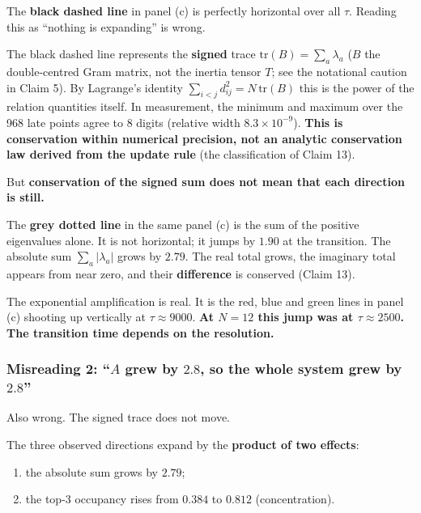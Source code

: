 \documentclass[
  10pt,
]{article}
\providecommand{\tightlist}{%
  \setlength{\itemsep}{0pt}\setlength{\parskip}{0pt}}
\begin{document}
The \textbf{black dashed line} in panel (c) is perfectly horizontal over
all \(\tau\). Reading this as ``nothing is expanding'' is wrong.

The black dashed line represents the \textbf{signed} trace
\(\mathrm{tr}(B) = \sum_a\lambda_a\) (\(B\) the double-centred Gram
matrix, not the inertia tensor \(T\); see the notational caution in
Claim 5). By Lagrange's identity
\(\sum_{i<j}d_{ij}^2 = N\,\mathrm{tr}(B)\) this is the power of the
relation quantities itself. In measurement, the minimum and maximum over
the 968 late points agree to 8 digits (relative width
\(8.3\times10^{-9}\)). \textbf{This is conservation within numerical
precision, not an analytic conservation law derived from the update
rule} (the classification of Claim 13).

But \textbf{conservation of the signed sum does not mean that each
direction is still.}

The \textbf{grey dotted line} in the same panel (c) is the sum of the
positive eigenvalues alone. It is not horizontal; it jumps by \(1.90\)
at the transition. The absolute sum \(\sum_a|\lambda_a|\) grows by
\(2.79\). The real total grows, the imaginary total appears from near
zero, and their \textbf{difference} is conserved (Claim 13).

The exponential amplification is real. It is the red, blue and green
lines in panel (c) shooting up vertically at \(\tau\approx9000\).
\textbf{At \(N=12\) this jump was at \(\tau\approx2500\). The transition
time depends on the resolution.}

\subsubsection{\texorpdfstring{Misreading 2: ``\(A\) grew by \(2.8\), so
the whole system grew by
\(2.8\)''}{Misreading 2: ``A grew by 2.8, so the whole system grew by 2.8''}}\label{misreading-2-a-grew-by-2.8-so-the-whole-system-grew-by-2.8}

Also wrong. The signed trace does not move.

The three observed directions expand by the \textbf{product of two
effects}:

\begin{enumerate}
\def\labelenumi{\arabic{enumi}.}
\tightlist
\item
  the absolute sum grows by \(2.79\);
\item
  the top-3 occupancy rises from \(0.384\) to \(0.812\) (concentration).
\end{enumerate}
\end{document}
